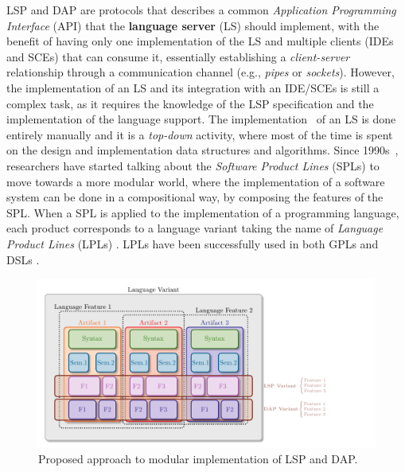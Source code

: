 LSP and DAP are protocols that describes a common \textit{Application Programming Interface} (API) that the \textbf{language server} (LS) should implement, with the benefit of having only one implementation of the LS and multiple clients (IDEs and SCEs) that can consume it, essentially establishing a \textit{client-server} relationship through a communication channel (e.g., \textit{pipes} or \textit{sockets}).
However, the implementation of an LS and its integration with an IDE/SCEs is still a complex task, as it requires the knowledge of the LSP specification and the implementation of the language support.
The implementation~\cite{Gunasinghe22} of an LS is done entirely manually and it is a \textit{top-down} activity, where most of the time is spent on the design and implementation data structures and algorithms.
Since 1990s~\cite{Kang90}, researchers have started talking about the \textit{Software Product Lines} (SPLs) \cite{Cazzola23d, Cazzola20} to move towards a more modular world, where the implementation of a software system can be done in a compositional way, by composing the features of the SPL.
When a SPL is applied to the implementation of a programming language, each product corresponds to a language variant \cite{Cazzola15f} taking the name of \textit{Language Product Lines} (LPLs) \cite{Cazzola15f}. LPLs have been successfully used in both GPLs \cite{Cazzola16, Cazzola16i, Cazzola15f} and DSLs \cite{Haugen08, Cazzola14e, White09}.
\begin{figure}[t]
    \centering
    \includegraphics[width=0.9\linewidth]{figs/concept/module_with_lsp.pdf}
    \caption{Proposed approach to modular implementation of LSP and DAP.}
    \label{lst:concept:module_with_lsp}
\end{figure}

